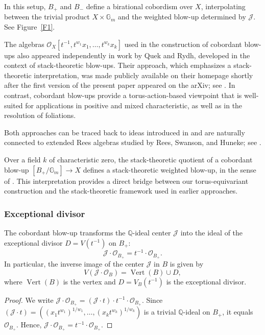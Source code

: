 \documentclass{amsart}
\newcommand{\QQ}{{\mathbb{Q}}}
\newcommand{\GG}{{\mathbb{G}}}
\newcommand{\cA}{{\mathcal A}}
\newcommand{\cJ}{{\mathcal J}}
\newcommand{\cO}{{\mathcal O}}
\newcommand{\Ver}{{\operatorname{Vert}}}
\newcommand{\ext}{{\operatorname{ext}}}
\newcommand{\Spec}{\operatorname{Spec}}
\renewcommand{\setminus}{\smallsetminus}
\begin{document}
In this setup, \( B_+ \) and \( B_- \) define a birational cobordism over \( X \), interpolating between the trivial product \( X \times \mathbb{G}_m \) and the weighted blow-up determined by \( \mathcal{J} \). See Figure~\ref{F1}.
\begin{remark}
The algebras ${\cO_X}[t^{-1}, t^{w_1}x_1, \ldots, t^{w_k}x_k]$ used in the construction of cobordant blow-ups also appeared independently in work by Quek and Rydh, developed in the context of stack-theoretic blow-ups. Their approach, which emphasizes a stack-theoretic interpretation, was made publicly available on their homepage shortly after the first version \cite{W22} of the present paper appeared on the arXiv; see \cite{Rydh-proj}. In contrast, cobordant blow-ups provide a torus-action-based viewpoint that is well-suited for applications in positive and mixed characteristic, as well as in the resolution of foliations.

Both approaches can be traced back to ideas introduced in \cite{ATW-weighted} and are naturally connected to extended Rees algebras studied by Rees, Swanson, and Huneke; see \cite[Def.\ 5.1]{HS06}.

Over a field $k$ of characteristic zero, the stack-theoretic quotient of a cobordant blow-up $[B_+/\GG_m] \to X$ defines a stack-theoretic weighted blow-up, in the sense of \cite[Section~3.1]{ATW-weighted}. This interpretation provides a direct bridge between our torus-equivariant construction and the stack-theoretic framework used in earlier approaches.
\end{remark}

\subsubsection{Exceptional divisor}

\begin{lemma} \label{divisor}
The cobordant blow-up transforms the $\QQ$-ideal center $\cJ$ into the ideal of the exceptional divisor $D = V(t^{-1})$ on $B_+$:
\[
\cJ \cdot \cO_{B_+} = t^{-1} \cdot \cO_{B_+}.
\]
In particular, the inverse image of the center  $\cJ$ in \( B \) is given by
\[
V(\mathcal{J} \cdot \mathcal{O}_B) = \Ver(B) \cup D,
\]
where \( \Ver(B) \) is the vertex and \( D = V_B(t^{-1}) \) is the exceptional divisor.
\end{lemma}
\begin{proof}
We write $\cJ \cdot \cO_{B_+} = (\cJ \cdot t) \cdot t^{-1} \cdot \cO_{B_+}$. Since $(\cJ \cdot t) = ((x_1 t^{w_1})^{1/w_1}, \ldots, (x_k t^{w_k})^{1/w_k})$ is a trivial $\QQ$-ideal on $B_+$, it equals $\cO_{B_+}$. Hence, $\cJ \cdot \cO_{B_+} = t^{-1} \cdot \cO_{B_+}$.
\end{proof}
\end{document}
